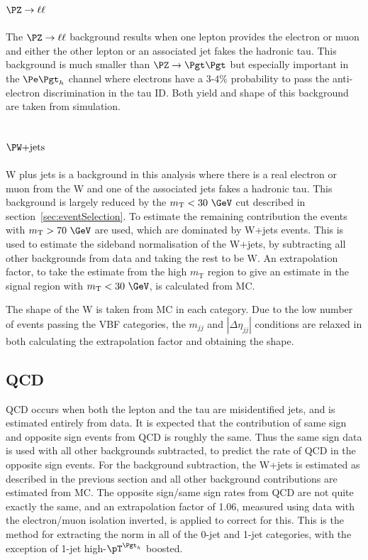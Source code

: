 \subsection{$\PZ\to\ell\ell$}
\label{sec:backgroundEstimation_Zll}

The $\PZ\to\ell\ell$ background results when one lepton provides the electron or
muon and either the other lepton or an associated jet fakes the hadronic tau. This
background is much smaller than $\ZToTauTau$ but especially important in the
$\etau$ channel where electrons have a $3$-$4\%$ probability to pass the
anti-electron discrimination in the tau ID. Both yield and shape of this
background are taken from simulation.

\subsection{$\WJets$}
\label{sec:backgroundEstimation_WplusJets}

W plus jets is a background in this analysis where there is a real electron or
muon from the W and one of the associated jets fakes a hadronic tau. This
background is largely reduced by the $m_{\text{T}}< 30~\GeV$ cut described in
section~\ref{sec:eventSelection}. To estimate the remaining contribution the
events with $m_{\text{T}}> 70~\GeV$ are used, which are dominated by W+jets 
events. This is used to estimate the sideband normalisation of the W+jets, by
subtracting all other backgrounds from data and taking the rest to be W.
An extrapolation factor, to take the estimate from the high $m_{\text{T}}$ region to
give an estimate in the signal region with $m_{\text{T}}< 30~\GeV$, is calculated from MC.

The shape of the W is taken from MC in each category. Due to the low number of
events passing the VBF categories, the $m_{jj}$ and $|\Delta\eta_{jj}|$
conditions are relaxed in both calculating the extrapolation factor and
obtaining the shape.

\subsection{QCD}
\label{sec:backgroundEstimation_QCD}

QCD occurs when both the lepton and the tau are misidentified jets, and is estimated 
entirely from data. It is expected that the contribution of
same sign and opposite sign events from QCD is roughly the same. Thus the same
sign data is used with all other backgrounds subtracted, to predict the rate of
QCD in the opposite sign events. For the background subtraction, the W+jets is
estimated as described in the previous section and all other background
contributions are estimated from MC. The opposite sign/same sign rates from QCD
are not quite exactly the same, and an extrapolation factor of 1.06, measured
using data with the electron/muon isolation inverted, is applied to correct for
this. This is the method for extracting the norm in all of the 0-jet and 1-jet
categories, with the exception of 1-jet high-$\pT^{\Pgth}$ boosted.

